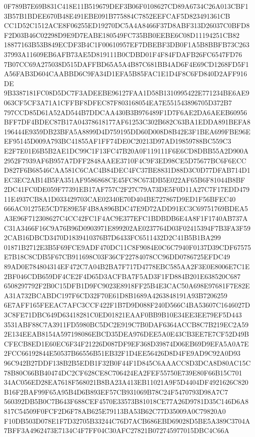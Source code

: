 \documentclass[UTF8,fontset=fandol,zihao=-4,a4paper]{ctexart}
\begin{document}
{{0F789B7E69B831C418E11B519679DEF3B06F0108627CD89A6734C26A013CBF13B57B1BDEE670B48E491EBE091B775884C7852EEFCAF5D823491361CB
CC1D52C1512ACE8F06255ED19270DC5A4A8466F37D8ABF313D26037C0BFD8F2D03B46C02298D9E9D7EABE180549FC735BB0EEBE6C08D11194251CB82
18877163B53B849ECDF3B4C1F00610957EF7DBEBF3DB0F1A5B8BBFB73C26337993A11609EB6AFB73AE5D819111B0CDBD01F4F84FDAFB26FC6547FD76
7B07CC69A275038D515DAFFBD65A5A4B87C681BB4AD6F4E69CD1268FD5F1A56FAB3D604CAABBD6C9FA34D1EFA5B85FAC1E1D4F8C6FD840D2AFF916DE
9B3387181FC08D5DC7F3ADEEBE96127FAA1D58B1310995422E771234BE6AE9063CF5CF3A71A1CFFBF8DFEC87F803168054EA7E551543896705D372B7
797CCD85D61A52AD544B7DDCAA430B3B976489F1D7F6AE2DA6AEEB60956BFF7DF4BDEC87B17A04378618177AF61253C302B682C63BA1EDDA891BEFA8
196444E9359DB23BFA5A8899D4D759195DD60D008D8B42E3F1BEA699FBE96EEF95145D009A793BC41855AF1FF74DE0C20213D97AD19859788BC559C3
E2F7E01E6B5B2AE1DC99C1F13FC47B20A0F119111F6E6CD8DBB55A2D900A2952F7939AF6B957A7DFF2848AAEE3710F4C9F3ED98CE5D75677BC6F6ECC
D827F6B68546CAA581C6CAC4B84DEC4FC37BE8831D88D3C0D77DFAB714D1EC3EC2AB14B5FA351AF9586868CE45FC8C673DB5E022AF65B6F81044B8BF
2DC41FC0DE059F77391EB17AF757C2F27C79A73DE5F0D11A27C7F17EDD47911E4937CB8A1D033429703CAE02340E70D404BE727867D9ED1F56BFEC40
666AC01275E5CD7E89E5F4B8A896BDC47E9D72ADD91EC3C69751769BDEA5A3E96F712308627C4CC42FC1F4AC9E377EFC1BDBDB6E4A8F1F1740AB737A
C31A3466F16C9A76B96D0903971E899202AE0237764D03F02415394F7B3FA3F592CAB16DBCD3470D1839410376B7D6433FC6511432D2C41B5B1BA299
01871B2712E3B5F69FCE9ADF470DC11C8F9084E0C6C7940F0137D39CDF67575E7B18C8CDB5F67CB911698C03F36CF22784078CC96DD0786725EFDC49
89AD0E784804314EF472C7A04B2BA7F717D4778EBC585AA2F3E0E8006E7C1E2BF046CDB659DF4CE2F4D65D3ACFBA7F5AD3F1FD884B201E638520C687
6508297792F2B0C15DFB1D9FC9023E8918FF25B4E3CAC50A698E97681F7E82EA31A732BCABDC197F6CD32F70E61D8B1689A4263848191A93B7206259
6E7AFF165FEEAC7AFC3CCF422F1B7D9D088F240D566C4BA53607C1646027D3C8FE71DBC649D63418281C0ED01821EAAF0BB9B10E34EE3EE79EF5D443
3531ABF88C7A3911FD5980BC5DC2E919C7B0DAF6364ACCB8C7B219EC2A592E134EEAB8154A597198086EBCD35DEA976DEE5A0E43CB3EE7E7CF52D49B
CFECB8ED1E60EC6F34F21226D087DF9EF368D39874D06EB69D9EFA5A0A7E2FCC66192844E50537B66556B51EB32F1D4EE56426D8D4FE9AD9C92A0D93
96C942B27DDF138B2B5EDB1F32B0F44F1D845C6AAACC8D3DCA8D80AC15C78B80C66BB40474DC2CF628CE8C706424EA2FEF55750E739E80F66B15C701
34AC056ED28EA7618F568021B8BA23A413EB11021A9F5D4404DF4921626C820B16F2BAF99F65A95B4D6B893EF57CB931069B78C24F5470793D98A7C7
560392DB5B0C7B643F688CEF4570E33573B81018CE77A26D9781D35C146D6A8817C54509F0FCF2D6F78AB625E79113BA53B62C77D35009A0C79820A0
F10DB503D078E1F7D32705B33244C76D7ACB686EBD69028D5BE5A389C3704A7BFF3A4962473E7134C4F7FF04C30AFC27821B072745977015DBC4C66A
}}
\end{document}
